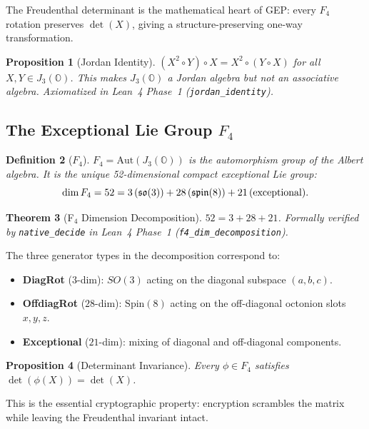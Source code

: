 \documentclass[11pt,letterpaper]{article}
\newtheorem{theorem}{Theorem}[section]
\newtheorem{definition}[theorem]{Definition}
\newtheorem{proposition}[theorem]{Proposition}
\theoremstyle{definition}
\begin{document}
The Freudenthal determinant is the mathematical heart of GEP: every $F_4$
rotation preserves $\det(X)$, giving a structure-preserving one-way
transformation.

\begin{proposition}[Jordan Identity]
$(X^2 \circ Y) \circ X = X^2 \circ (Y \circ X)$ for all $X,Y \in J_3(\mathbb{O})$.
This makes $J_3(\mathbb{O})$ a Jordan algebra but \emph{not} an associative algebra.
Axiomatized in Lean~4 Phase~1 (\texttt{jordan\_identity}).
\end{proposition}

\subsection{The Exceptional Lie Group $F_4$}

\begin{definition}[$F_4$]
$F_4 = \mathrm{Aut}(J_3(\mathbb{O}))$ is the automorphism group of the Albert
algebra.  It is the unique 52-dimensional compact exceptional Lie group:
\[
\dim F_4 = 52 = 3\,(\mathfrak{so}(3)) + 28\,(\mathfrak{spin}(8)) +
21\,({\rm exceptional}).
\]
\end{definition}

\begin{theorem}[F$_4$ Dimension Decomposition]
$52 = 3 + 28 + 21$. \textit{Formally verified by} \texttt{native\_decide}
\textit{in Lean~4 Phase~1 (\texttt{f4\_dim\_decomposition})}.
\end{theorem}

The three generator types in the decomposition correspond to:
\begin{itemize}[nosep]
\item \textbf{DiagRot} ($3$-dim): $SO(3)$ acting on the diagonal subspace
  $(a,b,c)$.
\item \textbf{OffdiagRot} ($28$-dim): $\mathrm{Spin}(8)$ acting on the
  off-diagonal octonion slots $x,y,z$.
\item \textbf{Exceptional} ($21$-dim): mixing of diagonal and off-diagonal
  components.
\end{itemize}

\begin{proposition}[Determinant Invariance]
Every $\phi \in F_4$ satisfies $\det(\phi(X)) = \det(X)$.
\end{proposition}

This is the essential cryptographic property: encryption scrambles the matrix
while leaving the Freudenthal invariant intact.
\end{document}
